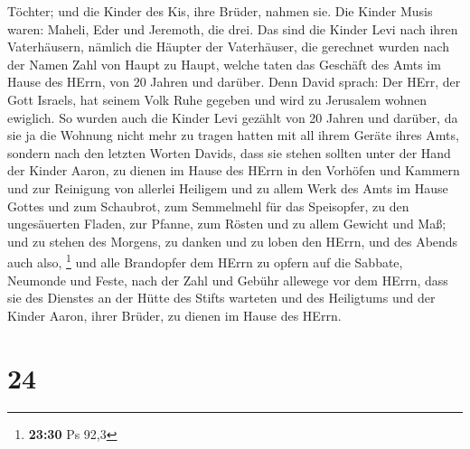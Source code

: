 Töchter; und die Kinder des Kis, ihre Brüder, nahmen sie.
 Die Kinder Musis waren: Maheli, Eder und Jeremoth, die
drei.  Das sind die Kinder Levi nach ihren Vaterhäusern,
nämlich die Häupter der Vaterhäuser, die gerechnet wurden nach der Namen
Zahl von Haupt zu Haupt, welche taten das Geschäft des Amts im Hause des
HErrn, von 20 Jahren und darüber.  Denn David sprach: Der
HErr, der Gott Israels, hat seinem Volk Ruhe gegeben und wird zu
Jerusalem wohnen ewiglich.  So wurden auch die Kinder
Levi gezählt von 20 Jahren und darüber, da sie ja die Wohnung nicht mehr
zu tragen hatten mit all ihrem Geräte ihres Amts, 
sondern nach den letzten Worten Davids,  dass sie stehen
sollten unter der Hand der Kinder Aaron, zu dienen im Hause des HErrn in
den Vorhöfen und Kammern und zur Reinigung von allerlei Heiligem und zu
allem Werk des Amts im Hause Gottes  und zum Schaubrot,
zum Semmelmehl für das Speisopfer, zu den ungesäuerten Fladen, zur
Pfanne, zum Rösten und zu allem Gewicht und Maß;  und zu
stehen des Morgens, zu danken und zu loben den HErrn, und des Abends
auch also, \footnote{\textbf{23:30} Ps 92,3}  und alle
Brandopfer dem HErrn zu opfern auf die Sabbate, Neumonde und Feste, nach
der Zahl und Gebühr allewege vor dem HErrn,  dass sie des
Dienstes an der Hütte des Stifts warteten und des Heiligtums und der
Kinder Aaron, ihrer Brüder, zu dienen im Hause des HErrn.

\hypertarget{section-23}{%
\section{24}\label{section-23}}


